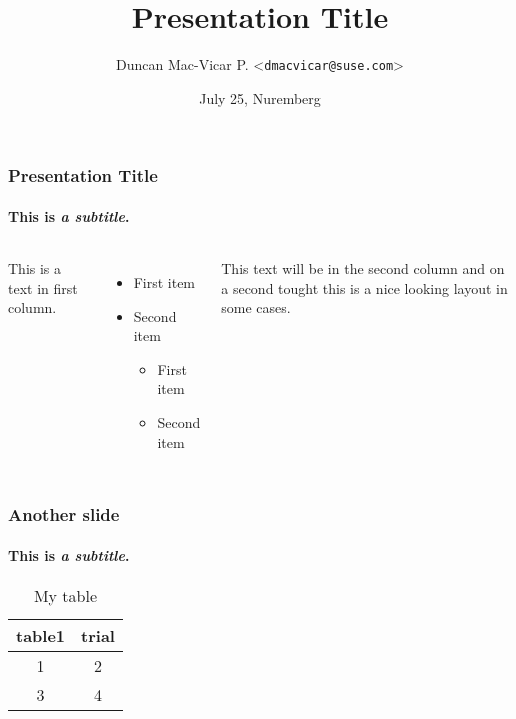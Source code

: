 \documentclass[aspectratio=169]{beamer}
\title{Presentation Title}
\date{July 25, Nuremberg}
\author{Duncan Mac-Vicar P. <\texttt{dmacvicar@suse.com}>}
\begin{document}
\begin{frame}
\titlepage
\end{frame}

\begin{frame} 
\frametitle{Presentation Title}
\framesubtitle{This is \textit{a subtitle}.}

\begin{columns}

This is a text in first column.
\begin{itemize}
  \item First item
  \item Second item
  \begin{itemize}
    \item First item
    \item Second item
  \end{itemize}
\end{itemize}

This text will be in the second column
and on a second tought this is a nice looking
layout in some cases.
\end{columns}

\end{frame}

\begin{frame} 
\frametitle{Another slide}
\framesubtitle{This is \textit{a subtitle}.}

\begin{table}
  \begin{tabular}{c|c}
    table1 & trial \\
    \hline
    \hline
    1 & 2 \\
    3 & 4
  \end{tabular}
  \caption*{My table}
\end{table}     
\end{frame}
\end{document}
